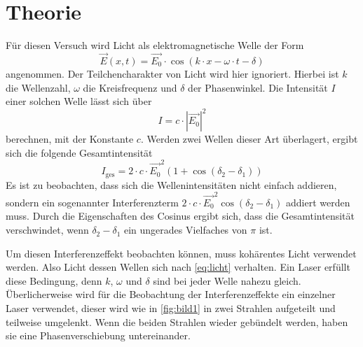 \section{Theorie}
\label{sec:Theorie}



 
Für diesen Versuch wird Licht als elektromagnetische Welle der Form 
\begin{equation}
    \vec{E}(x,t) = \vec{E_0} \cdot \cos{\left(k \cdot x - \omega \cdot t - \delta\right)}
    \label{eq:licht}
\end{equation}
angenommen. 
Der Teilchencharakter von Licht wird hier ignoriert.
Hierbei ist $k$ die Wellenzahl, $\omega$ die Kreisfrequenz und $\delta$ der Phasenwinkel.
Die Intensität $I$ einer solchen Welle lässt sich über 
\begin{equation}
    I = c \cdot |\vec{E_0}|^2
\end{equation}
berechnen, mit der Konstante $c$.
Werden zwei Wellen dieser Art überlagert, ergibt sich die folgende Gesamtintensität
\begin{equation}
    I_\text{ges} = 2\cdot c \cdot \vec{E_0}^2 \left(1 + \cos{(\delta_2 - \delta_1)}\right)
\end{equation}
Es ist zu beobachten, dass sich die Wellenintensitäten nicht einfach addieren, sondern ein sogenannter Interferenzterm $2\cdot c \cdot \vec{E_0}^2\cos{(\delta_2 - \delta_1)}$ addiert werden muss.
Durch die Eigenschaften des Cosinus ergibt sich, dass die Gesamtintensität verschwindet, wenn $\delta_2 - \delta_1$ ein ungerades Vielfaches von $\pi$ ist.

Um diesen Interferenzeffekt beobachten können, muss kohärentes Licht verwendet werden.
Also Licht dessen Wellen sich nach \autoref{eq:licht} verhalten. 
Ein Laser erfüllt diese Bedingung, denn $k$, $\omega$ und $\delta$ sind bei jeder Welle nahezu gleich. 
Überlicherweise wird für die Beobachtung der Interferenzeffekte ein einzelner Laser verwendet, dieser wird wie in \autoref{fig:bild1} in zwei Strahlen aufgeteilt und teilweise umgelenkt.
Wenn die beiden Strahlen wieder gebündelt werden, haben sie eine Phasenverschiebung untereinander.

